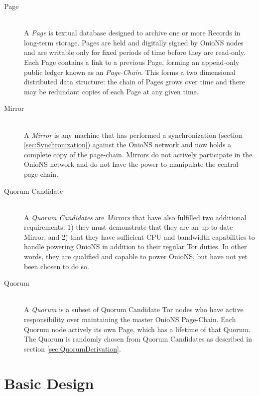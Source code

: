 \begin{description}
	\item[Page] \hfill \\
		A \emph{Page} is textual database designed to archive one or more Records in long-term storage. Pages are held and digitally signed by OnioNS nodes and are writable only for fixed periods of time before they are read-only. Each Page contains a link to a previous Page, forming an append-only public ledger known as an \emph{Page-Chain}. This forms a two dimensional distributed data structure: the chain of Pages grows over time and there may be redundant copies of each Page at any given time. 
		
	\item[Mirror] \hfill \\
		A \emph{Mirror} is any machine that has performed a synchronization (section \ref{sec:Synchronization}) against the OnioNS network and now holds a complete copy of the page-chain. Mirrors do not actively participate in the OnioNS network and do not have the power to manipulate the central page-chain.

	\item[Quorum Candidate] \hfill \\
		A \emph{Quorum Candidates} are \emph{Mirrors} that have also fulfilled two additional requirements: 1) they must demonstrate that they are an up-to-date Mirror, and 2) that they have sufficient CPU and bandwidth capabilities to handle powering OnioNS in addition to their regular Tor duties. In other words, they are qualified and capable to power OnioNS, but have not yet been chosen to do so.
		
	\item[Quorum] \hfill \\
		A \emph{Quorum} is a subset of Quorum Candidate Tor nodes who have active responsibility over maintaining the master OnioNS Page-Chain. Each Quorum node actively its own Page, which has a lifetime of that Quorum. The Quorum is randomly chosen from Quorum Candidates as described in section \ref{sec:QuorumDerivation}.
		
\end{description}

\section{Basic Design}

